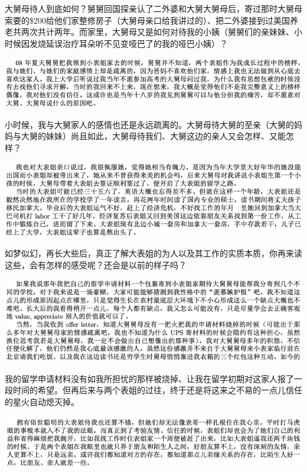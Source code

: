 \documentclass[9pt, b5paper]{article}
\begin{document}
大舅母待人到底如何？舅舅回国探亲认了二外婆和大舅大舅母后，寄过那时大舅母索要的\$200给他们家整修房子（大舅母亲口给我讲过的）、把二外婆接到过美国养老共两次共计两年。而家里，大舅母又是如何对待我的小姨（舅舅们的亲妹妹、小时候因发烧延误治疗耳朵听不见变哑巴了的我的哑巴小姨）？

\begin{center}
\includegraphics[width=.9\linewidth]{./pic/p1p123-5.png}
\end{center}

小时候，我与大舅家人的感情也还是永远疏离的。大舅母待大舅的至亲（大舅的妈妈与大舅的妹妹）尚且如此，大舅母待我们、大舅这边的亲人又会怎样、又能怎样？

\begin{center}
\includegraphics[width=.9\linewidth]{./pic/p1p123-6.png}
\end{center}

如梦似幻，再长大些后，真正了解大表姐的为人以及其工作的实质本质，你再来读这些，会有怎样的感受呢？还会是以前的样子吗？

\begin{center}
\includegraphics[width=.9\linewidth]{./pic/p1p124-2.png}
\end{center}

我的留学申请材料没有如我所担忧的那样被烧掉、让我在留学初期对这家人报了一段时间的希望。但再后来与两个表姐的过往，终于还是将这来之不易的一点儿信任的星火自动熄灭掉。 

\begin{center}
\includegraphics[width=.9\linewidth]{./pic/p1p123-7.png}
\end{center}
\end{document}
